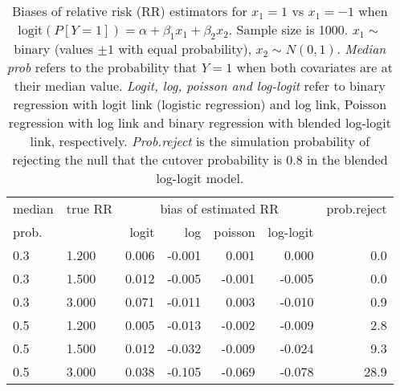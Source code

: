 \documentclass[12pt,a4paper]{article}
\begin{document}
\begin{table}[H] 
\small\sf\centering 
\caption{Biases of relative risk (RR) estimators for $x_1=1$ vs $x_1=-1$ when $\mbox{logit}(P[Y=1])=\alpha+\beta_1 x_1 + \beta_2 x_2$. Sample size is 1000. $x_1 \sim $binary (values $\pm 1$ with equal probability), $x_2 \sim N(0,1)$. {\it Median prob} refers to the probability that $Y=1$ when both covariates are at their median value. {\it Logit, log, poisson and log-logit} refer to binary regression with logit link (logistic regression) and log link, Poisson regression with log link and binary regression with blended log-logit link, respectively. {\it Prob.reject} is the simulation probability of rejecting the null that the cutover probability is $0.8$ in the blended log-logit model.} 
\begin{tabular}{llrrrrr} 
\toprule 
median & true RR & \multicolumn{4}{c}{bias of estimated RR} & prob.reject \\ 
prob. & & logit & log & poisson & log-logit  & \\ \midrule 
0.3 & 1.200 & 0.006 & -0.001 &  0.001 &  0.000 &  0.0 \\  
0.3 & 1.500 & 0.012 & -0.005 & -0.001 & -0.005 &  0.0 \\  
0.3 & 3.000 & 0.071 & -0.011 &  0.003 & -0.010 &  0.9 \\  
0.5 & 1.200 & 0.005 & -0.013 & -0.002 & -0.009 &  2.8 \\  
0.5 & 1.500 & 0.012 & -0.032 & -0.009 & -0.024 &  9.3 \\  
0.5 & 3.000 & 0.038 & -0.105 & -0.069 & -0.078 & 28.9 \\  
\bottomrule 
\end{tabular} 
\end{table} 
\end{document}
